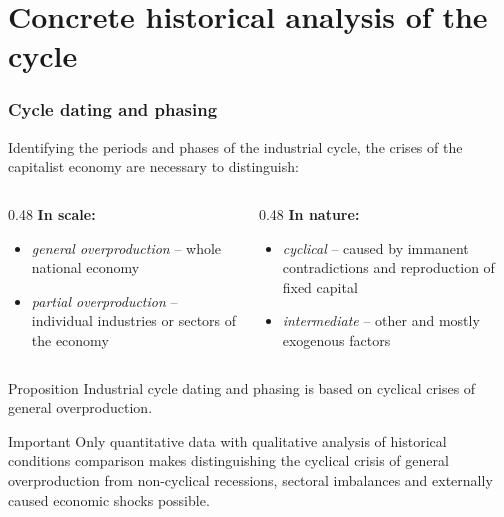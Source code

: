 \section{Concrete historical analysis of the cycle}

\begin{frame}
  \frametitle{Cycle dating and phasing}
  Identifying the periods and phases of the industrial cycle, the crises of the capitalist economy are necessary to distinguish:

  \vspace{10pt}

  \begin{columns}[T,onlytextwidth]
    \begin{column}{0.48\textwidth}
      \textbf{In scale:}
      \begin{itemize}
        \item \textit{general overproduction} – whole national economy
        \item \textit{partial overproduction} – individual industries or sectors of the economy
      \end{itemize}
    \end{column}

    \begin{column}{0.48\textwidth}
      \textbf{In nature:}
      \begin{itemize}
        \item \textit{cyclical} – caused by immanent contradictions and reproduction of fixed capital
        \item \textit{intermediate} – other and mostly exogenous factors
      \end{itemize}
    \end{column}
  \end{columns}

  \begin{block}{Proposition}
    Industrial cycle dating and phasing is based on cyclical crises of general overproduction.
  \end{block}

  \begin{alertblock}{Important}
    Only quantitative data with qualitative analysis of historical conditions comparison makes distinguishing the cyclical crisis of general overproduction from non-cyclical recessions, sectoral imbalances and externally caused economic shocks possible.
  \end{alertblock}
\end{frame}

